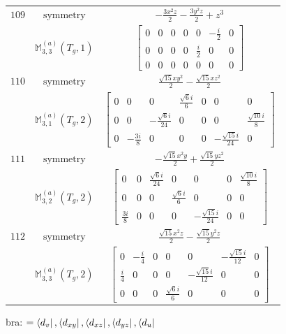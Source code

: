 \documentclass[fleqn,8pt,landscape]{jsarticle}
\begin{document}
\begin{longtable}{ccc}
$ 109 $ & $ \text{symmetry} $ & $ - \frac{3 x^{2} z}{2} - \frac{3 y^{2} z}{2} + z^{3} $ \\
$  $ & $ \mathbb{M}_{3,3}^{(a)}(T_{g},1) $ & $ \begin{bmatrix} 0 & 0 & 0 & 0 & 0 & - \frac{i}{2} & 0 \\ 0 & 0 & 0 & 0 & \frac{i}{2} & 0 & 0 \\ 0 & 0 & 0 & 0 & 0 & 0 & 0 \end{bmatrix} $ \\ \hline
$ 110 $ & $ \text{symmetry} $ & $ \frac{\sqrt{15} x y^{2}}{2} - \frac{\sqrt{15} x z^{2}}{2} $ \\
$  $ & $ \mathbb{M}_{3,1}^{(a)}(T_{g},2) $ & $ \begin{bmatrix} 0 & 0 & 0 & \frac{\sqrt{6} i}{6} & 0 & 0 & 0 \\ 0 & 0 & - \frac{\sqrt{6} i}{24} & 0 & 0 & 0 & \frac{\sqrt{10} i}{8} \\ 0 & - \frac{3 i}{8} & 0 & 0 & 0 & - \frac{\sqrt{15} i}{24} & 0 \end{bmatrix} $ \\ \hline
$ 111 $ & $ \text{symmetry} $ & $ - \frac{\sqrt{15} x^{2} y}{2} + \frac{\sqrt{15} y z^{2}}{2} $ \\
$  $ & $ \mathbb{M}_{3,2}^{(a)}(T_{g},2) $ & $ \begin{bmatrix} 0 & 0 & \frac{\sqrt{6} i}{24} & 0 & 0 & 0 & \frac{\sqrt{10} i}{8} \\ 0 & 0 & 0 & \frac{\sqrt{6} i}{6} & 0 & 0 & 0 \\ \frac{3 i}{8} & 0 & 0 & 0 & - \frac{\sqrt{15} i}{24} & 0 & 0 \end{bmatrix} $ \\ \hline
$ 112 $ & $ \text{symmetry} $ & $ \frac{\sqrt{15} x^{2} z}{2} - \frac{\sqrt{15} y^{2} z}{2} $ \\
$  $ & $ \mathbb{M}_{3,3}^{(a)}(T_{g},2) $ & $ \begin{bmatrix} 0 & - \frac{i}{4} & 0 & 0 & 0 & - \frac{\sqrt{15} i}{12} & 0 \\ \frac{i}{4} & 0 & 0 & 0 & - \frac{\sqrt{15} i}{12} & 0 & 0 \\ 0 & 0 & 0 & \frac{\sqrt{6} i}{6} & 0 & 0 & 0 \end{bmatrix} $ \\ \hline
\end{longtable}
bra: $=\bra{d_{v}}, \bra{d_{xy}}, \bra{d_{xz}}, \bra{d_{yz}}, \bra{d_{u}}$
\end{document}
